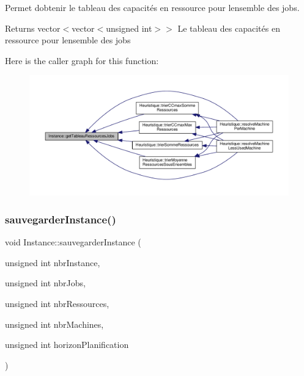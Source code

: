 Permet d\textquotesingle{}obtenir le tableau des capacités en ressource pour l\textquotesingle{}ensemble des jobs. 

\begin{DoxyReturn}{Returns}
vector$<$vector$<$unsigned int$>$$>$ Le tableau des capacités en ressource pour l\textquotesingle{}ensemble des jobs 
\end{DoxyReturn}
Here is the caller graph for this function\+:\nopagebreak
\begin{figure}[H]
\begin{center}
\leavevmode
\includegraphics[width=350pt]{classInstance_ad4124bd2f1edb83a46ef94cfe07eafc8_icgraph}
\end{center}
\end{figure}
\mbox{\label{classInstance_a36e8de8c42d48f16f14f37622dbd3eb1}} 
\subsubsection{\texorpdfstring{sauvegarder\+Instance()}{sauvegarderInstance()}}
{\footnotesize\ttfamily void Instance\+::sauvegarder\+Instance (\begin{DoxyParamCaption}\item[{unsigned int}]{nbr\+Instance,  }\item[{unsigned int}]{nbr\+Jobs,  }\item[{unsigned int}]{nbr\+Ressources,  }\item[{unsigned int}]{nbr\+Machines,  }\item[{unsigned int}]{horizon\+Planification }\end{DoxyParamCaption})}


